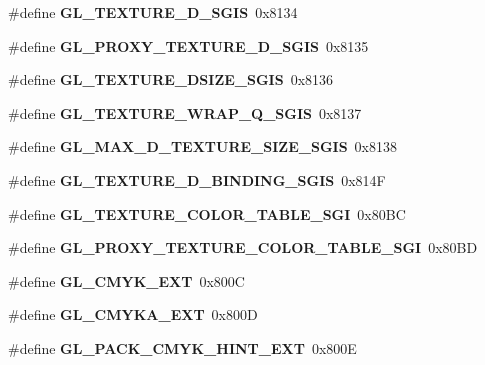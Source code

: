\begin{DoxyCompactItemize}
\item 
\#define {\bfseries G\+L\+\_\+\+T\+E\+X\+T\+U\+R\+E\+\_\+D\+\_\+\+S\+G\+I\+S}~0x8134\label{_s_d_l__opengl_8h_a68f8e4e09c293cdba5e18ead644c7132}

\item 
\#define {\bfseries G\+L\+\_\+\+P\+R\+O\+X\+Y\+\_\+\+T\+E\+X\+T\+U\+R\+E\+\_\+D\+\_\+\+S\+G\+I\+S}~0x8135\label{_s_d_l__opengl_8h_a0dbb417754f62ae2e869cb5aba639ea0}

\item 
\#define {\bfseries G\+L\+\_\+\+T\+E\+X\+T\+U\+R\+E\+\_\+D\+S\+I\+Z\+E\+\_\+\+S\+G\+I\+S}~0x8136\label{_s_d_l__opengl_8h_accb6c1c52fe9a1e1f6f0282c518b2c7f}

\item 
\#define {\bfseries G\+L\+\_\+\+T\+E\+X\+T\+U\+R\+E\+\_\+\+W\+R\+A\+P\+\_\+\+Q\+\_\+\+S\+G\+I\+S}~0x8137\label{_s_d_l__opengl_8h_a3d185a9729d4aa08681d15b855651969}

\item 
\#define {\bfseries G\+L\+\_\+\+M\+A\+X\+\_\+D\+\_\+\+T\+E\+X\+T\+U\+R\+E\+\_\+\+S\+I\+Z\+E\+\_\+\+S\+G\+I\+S}~0x8138\label{_s_d_l__opengl_8h_a88045fea586e8151a4338b78501f5f5b}

\item 
\#define {\bfseries G\+L\+\_\+\+T\+E\+X\+T\+U\+R\+E\+\_\+D\+\_\+\+B\+I\+N\+D\+I\+N\+G\+\_\+\+S\+G\+I\+S}~0x814\+F\label{_s_d_l__opengl_8h_a10229b350d518376f110fbabc4c3228b}

\item 
\#define {\bfseries G\+L\+\_\+\+T\+E\+X\+T\+U\+R\+E\+\_\+\+C\+O\+L\+O\+R\+\_\+\+T\+A\+B\+L\+E\+\_\+\+S\+G\+I}~0x80\+B\+C\label{_s_d_l__opengl_8h_a0e2dc494e03bb00801c9ee4af6415402}

\item 
\#define {\bfseries G\+L\+\_\+\+P\+R\+O\+X\+Y\+\_\+\+T\+E\+X\+T\+U\+R\+E\+\_\+\+C\+O\+L\+O\+R\+\_\+\+T\+A\+B\+L\+E\+\_\+\+S\+G\+I}~0x80\+B\+D\label{_s_d_l__opengl_8h_aba618a6b554e101ec809f28d485b7bba}

\item 
\#define {\bfseries G\+L\+\_\+\+C\+M\+Y\+K\+\_\+\+E\+X\+T}~0x800\+C\label{_s_d_l__opengl_8h_a7e2eaa6abf9120b74a174f842b2c49b4}

\item 
\#define {\bfseries G\+L\+\_\+\+C\+M\+Y\+K\+A\+\_\+\+E\+X\+T}~0x800\+D\label{_s_d_l__opengl_8h_a625a98c7711316e11aa9a6424839b9ef}

\item 
\#define {\bfseries G\+L\+\_\+\+P\+A\+C\+K\+\_\+\+C\+M\+Y\+K\+\_\+\+H\+I\+N\+T\+\_\+\+E\+X\+T}~0x800\+E\label{_s_d_l__opengl_8h_a2c75898afd7ab3984930a43e6692cb3f}


\end{DoxyCompactItemize}
